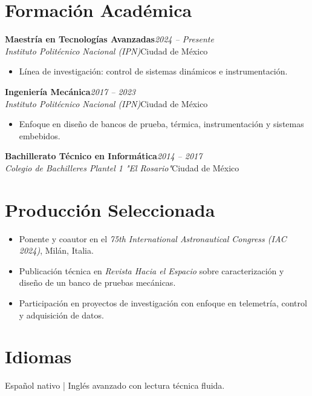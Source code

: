 \documentclass[10pt,a4paper]{article}
\newcommand{\resumeItem}[1]{\item\small #1}
\newcommand{\resumeSubheading}[4]{%
  \vspace{3pt}\noindent
  \textbf{#1}\hfill{\small\textit{\color{graytext}#2}}\\
  \textit{\color{graytext}#3}\hfill{\small\color{graytext}#4}\vspace{2pt}
}
\newcommand{\resumeItemListStart}{\begin{itemize}[leftmargin=1.15em,itemsep=1.5pt,topsep=2pt,partopsep=0pt,parsep=0pt]}
\newcommand{\resumeItemListEnd}{\end{itemize}\vspace{2pt}}
\begin{document}
\section{Formaci\'on Acad\'emica}

\resumeSubheading
{Maestr\'ia en Tecnolog\'ias Avanzadas}{2024 -- Presente}
{Instituto Polit\'ecnico Nacional (IPN)}{Ciudad de M\'exico}
\resumeItemListStart
  \resumeItem{L\'inea de investigaci\'on: control de sistemas din\'amicos e instrumentaci\'on.}
\resumeItemListEnd

\resumeSubheading
{Ingenier\'ia Mec\'anica}{2017 -- 2023}
{Instituto Polit\'ecnico Nacional (IPN)}{Ciudad de M\'exico}
\resumeItemListStart
  \resumeItem{Enfoque en dise\~no de bancos de prueba, t\'ermica, instrumentaci\'on y sistemas embebidos.}
\resumeItemListEnd

\resumeSubheading
{Bachillerato T\'ecnico en Inform\'atica}{2014 -- 2017}
{Colegio de Bachilleres Plantel 1 "El Rosario"}{Ciudad de M\'exico}

\vspace{4pt}
\section{Producci\'on Seleccionada}
\small
\begin{itemize}[leftmargin=1.15em,itemsep=2pt,topsep=3pt,partopsep=0pt,parsep=0pt]
  \item Ponente y coautor en el \textit{75th International Astronautical Congress (IAC 2024)}, Mil\'an, Italia.
  \item Publicaci\'on t\'ecnica en \textit{Revista Hacia el Espacio} sobre caracterizaci\'on y dise\~no de un banco de pruebas mec\'anicas.
  \item Participaci\'on en proyectos de investigaci\'on con enfoque en telemetr\'ia, control y adquisici\'on de datos.
\end{itemize}

\section{Idiomas}
\small
Espa\~nol nativo | Ingl\'es avanzado con lectura t\'ecnica fluida.
\end{document}
